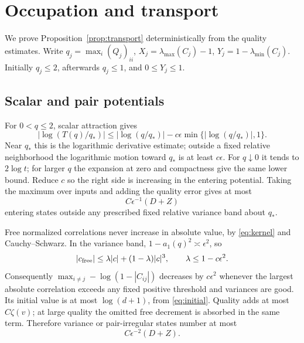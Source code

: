 \documentclass[11pt]{article}
\begin{document}
\section{Occupation and transport}\label{sec:occupation}
We prove Proposition~\ref{prop:transport} deterministically from the quality estimates. Write $q_j=\max_i(Q_j)_{ii}$, $X_j=\lambda_{\max}(C_j)-1$, $Y_j=1-\lambda_{\min}(C_j)$. Initially $q_j\le2$, afterwards $q_j\le1$, and $0\le Y_j\le1$.

\subsection{Scalar and pair potentials}
For $0<q\le2$, scalar attraction gives
\begin{equation}\label{eq:scalarpot}
 |\log(T(q)/q_*)|\le|\log(q/q_*)|-c\epsilon\min\{|\log(q/q_*)|,1\}.
\end{equation}
Near $q_*$ this is the logarithmic derivative estimate; outside a fixed relative neighborhood the logarithmic motion toward $q_*$ is at least $c\epsilon$. For $q\downarrow0$ it tends to $2\log t$; for larger $q$ the expansion at zero and compactness give the same lower bound. Reduce $c$ so the right side is increasing in the entering potential. Taking the maximum over inputs and adding the quality error gives at most
\begin{equation}\label{eq:scalarcount}
 C\epsilon^{-1}(D+Z)
\end{equation}
entering states outside any prescribed fixed relative variance band about $q_*$.

Free normalized correlations never increase in absolute value, by \eqref{eq:kernel} and Cauchy--Schwarz. In the variance band, $1-a_1(q)^2\asymp\epsilon^2$, so
\[
 |c_{\rm free}|\le\lambda|c|+(1-\lambda)|c|^3,\qquad \lambda\le1-c\epsilon^2.
\]
Consequently $\max_{i\ne j}-\log(1-|C_{ij}|)$ decreases by $c\epsilon^2$ whenever the largest absolute correlation exceeds any fixed positive threshold and variances are good. Its initial value is at most $\log(d+1)$, from \eqref{eq:initial}. Quality adds at most $C\zeta(v)$; at large quality the omitted free decrement is absorbed in the same term. Therefore variance or pair-irregular states number at most
\begin{equation}\label{eq:paircount}
 C\epsilon^{-2}(D+Z).
\end{equation}
\end{document}
